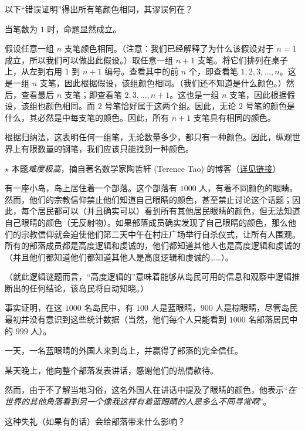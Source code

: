 \begin{exercise}
    以下``错误证明''得出所有笔颜色相同，其谬误何在？
    \begin{spoof}
        当笔数为 $1$ 时，命题显然成立。

        假设任意一组 $n$ 支笔颜色相同。（注意：我们已经解释了为什么该假设对于 $n = 1$ 成立，所以我们可以做出此假设。）取任意一组 $n + 1$ 支笔。将它们排列在桌子上，从左到右用 $1$ 到 $n + 1$ 编号。查看其中的前 $n$ 个，即查看笔 $1,2,3, \dots , n$。这是一组 $n$ 支笔，因此根据假设，该组颜色相同。（我们还不知道是什么颜色。）然后，查看最后 $n$ 支笔；即查看笔 $2,3, \dots ,n+1$。这也是一组 $n$ 支笔，因此根据假设，该组也颜色相同。而 $2$ 号笔恰好属于这两个组。因此，无论 $2$ 号笔的颜色是什么，其必然是中每支笔的颜色。因此，所有 $n+1$ 支笔具有相同的颜色。

        根据归纳法，这表明任何一组笔，无论数量多少，都只有一种颜色。因此，纵观世界上有限数量的钢笔，我们应该只能找到一种颜色。
    \end{spoof}
\end{exercise}

\begin{exercise}
    $\star$ 本题\emph{难度极高}，摘自著名数学家陶哲轩 (Terence Tao) 的博客（\href{https://terrytao.wordpress.com/2011/04/07/the-blue-eyed-islanders-puzzle-repost/}{详见链接}）

    有一座小岛，岛上居住着一个部落。这个部落有 $1000$ 人，有着不同颜色的眼睛。然而，他们的宗教信仰禁止他们知道自己眼睛的颜色，甚至禁止讨论这个话题；因此，每个居民都可以（并且确实可以）看到所有其他居民眼睛的颜色，但无法知道自己眼睛的颜色（无反射物）。如果部落成员确实发现了自己眼睛的颜色，那么他们的宗教信仰就会迫使他们第二天中午在村庄广场举行自杀仪式，让所有人围观。所有的部落成员都是高度逻辑和虔诚的，他们都知道其他人也是高度逻辑和虔诚的（并且他们都知道他们都知道其他人是高度逻辑和虔诚的……）。

    （就此逻辑谜题而言，``高度逻辑的''意味着能够从岛民可用的信息和观察中逻辑推断出的任何结论，该岛民将自动知晓。）

    事实证明，在这 $1000$ 名岛民中，有 $100$ 人是蓝眼睛，$900$ 人是棕眼睛，尽管岛民最初并没有意识到这些统计数据（当然，他们每个人只能看到 $1000$ 名部落居民中的 $999$ 人）。

    一天，一名蓝眼睛的外国人来到岛上，并赢得了部落的完全信任。

    某天晚上，他向整个部落发表讲话，感谢他们的热情款待。

    然而，由于不了解当地习俗，这名外国人在讲话中提及了眼睛的颜色，他表示``\emph{在世界的其他角落看到另一个像我这样有着蓝眼睛的人是多么不同寻常啊}''。

    这种失礼（如果有的话）会给部落带来什么影响？
\end{exercise}